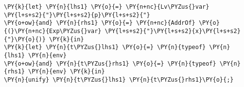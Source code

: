 \begin{Verbatim}[commandchars=\\\{\}]
\PY{k}{let} \PY{n}{lhs1} \PY{o}{=} \PY{n+nc}{Lv\PYZus{}var} \PY{l+s+s2}{"}\PY{l+s+s2}{p}\PY{l+s+s2}{"}
\PY{o+ow}{and} \PY{n}{rhs1} \PY{o}{=} \PY{n+nc}{AddrOf} \PY{o}{(}\PY{n+nc}{Exp\PYZus{}var} \PY{l+s+s2}{"}\PY{l+s+s2}{x}\PY{l+s+s2}{"}\PY{o}{)} \PY{k}{in}
\PY{k}{let} \PY{n}{t\PYZus{}lhs1} \PY{o}{=} \PY{n}{typeof} \PY{n}{lhs1} \PY{n}{env}
\PY{o+ow}{and} \PY{n}{t\PYZus{}rhs1} \PY{o}{=} \PY{n}{typeof} \PY{n}{rhs1} \PY{n}{env} \PY{k}{in}
\PY{n}{unify} \PY{n}{t\PYZus{}lhs1} \PY{n}{t\PYZus{}rhs1}\PY{o}{;}
\end{Verbatim}
